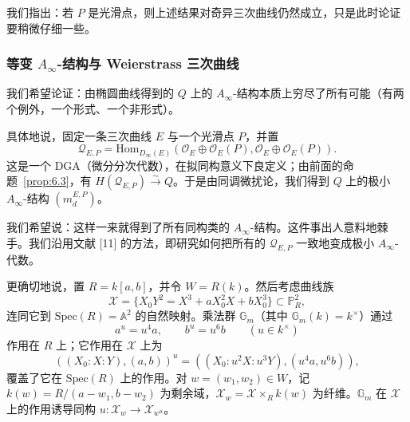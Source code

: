 我们指出：若 $P$ 是光滑点，则上述结果对奇异三次曲线仍然成立，只是此时论证要稍微仔细一些。

\subsubsection{\texorpdfstring{等变 $A_\infty$-结构与 Weierstrass 三次曲线}{等变 A∞-结构与 Weierstrass 三次曲线}}\label{subsec:equivariant-ainf}

我们希望论证：由椭圆曲线得到的 $Q$ 上的 $A_\infty$-结构本质上穷尽了所有可能（有两个例外，一个形式、一个非形式）。

具体地说，固定一条三次曲线 $E$ 与一个光滑点 $P$，并置
\[
\mathcal{Q}_{E,P}=\mathrm{Hom}_{D_\infty(E)}(\mathcal{O}_E\oplus\mathcal{O}_E(P),\mathcal{O}_E\oplus\mathcal{O}_E(P)).
\]
这是一个 DGA（微分分次代数），在拟同构意义下良定义；由前面的命题~\ref{prop:6.3}，有 $H(\mathcal{Q}_{E,P})\xrightarrow{\sim}Q$。于是由同调微扰论，我们得到 $Q$ 上的极小 $A_\infty$-结构 $(m_d^{E,P})$。

我们希望说：这样一来就得到了所有同构类的 $A_\infty$-结构。这件事出人意料地棘手。我们沿用文献 [11] 的方法，即研究如何把所有的 $\mathcal{Q}_{E,P}$ 一致地变成极小 $A_\infty$-代数。


更确切地说，置 $R=k[a,b]$，并令 $W=R(k)$。然后考虑曲线族
\[
\mathcal{X}=\{X_0Y^2=X^3+aX_0^2X+bX_0^3\}\subset\mathbb{P}^2_R,
\]
连同它到 $\mathrm{Spec}(R)=\mathbb{A}^2$ 的自然映射。乘法群 $\mathbb{G}_m$（其中 $\mathbb{G}_m(k)=k^{\times}$）通过
\[
a^u=u^4a,\qquad b^u=u^6b\qquad (u\in k^{\times})
\]
作用在 $R$ 上；它作用在 $\mathcal{X}$ 上为
\[
((X_0:X:Y),(a,b))^u=((X_0:u^2X:u^3Y),(u^4a,u^6b)),
\]
覆盖了它在 $\mathrm{Spec}(R)$ 上的作用。对 $w=(w_1,w_2)\in W$，记 $k(w)=R/(a-w_1,b-w_2)$ 为剩余域，$\mathcal{X}_w=\mathcal{X}\times_R k(w)$ 为纤维。$\mathbb{G}_m$ 在 $\mathcal{X}$ 上的作用诱导同构 $u:\mathcal{X}_w\to\mathcal{X}_{w^u}$。


